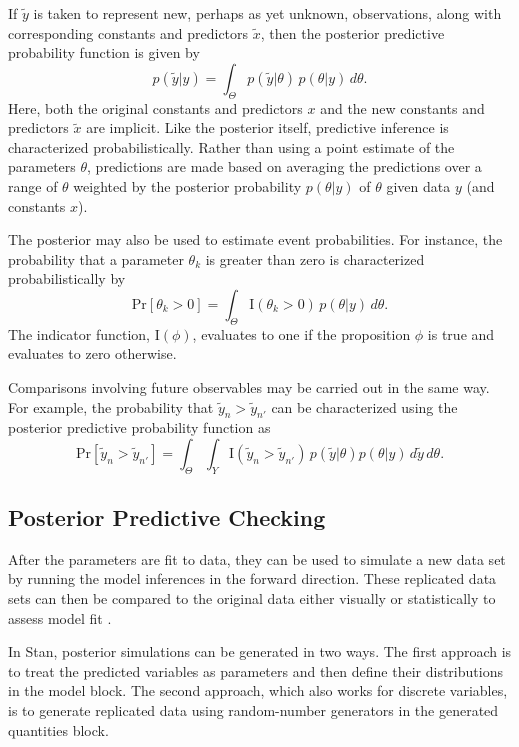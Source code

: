 If $\tilde{y}$ is taken to represent new, perhaps as yet unknown,
observations, along with corresponding constants and predictors
$\tilde{x}$, then the posterior predictive probability function is
given by
%
\[
p(\tilde{y}|y)
= \int_{\Theta} p(\tilde{y}|\theta) 
                \, p(\theta|y) \, d\theta.
\]
Here, both the original constants and predictors $x$ and the new
constants and predictors $\tilde{x}$ are implicit.  Like the posterior
itself, predictive inference is characterized probabilistically.
Rather than using a point estimate of the parameters $\theta$,
predictions are made based on averaging the predictions over a range
of $\theta$ weighted by the posterior probability $p(\theta|y)$ of
$\theta$ given data $y$ (and constants $x$).

The posterior may also be used to estimate event probabilities.  For
instance, the probability that a parameter $\theta_k$ is greater than
zero is characterized probabilistically by
%
\[
\mbox{Pr}[\theta_k > 0]
= \int_{\Theta} \mbox{I}(\theta_k > 0) \, p(\theta|y) \, d\theta.
\]
%
The indicator function, $\mbox{I}(\phi)$, evaluates to one if the
proposition $\phi$ is true and evaluates to zero otherwise.

Comparisons involving future observables may be carried out in
the same way.  For example, the probability that $\tilde{y}_n >
\tilde{y}_{n'}$ can be characterized using the posterior predictive
probability function as
\[
\mbox{Pr}[\tilde{y}_n > \tilde{y}_{n'}]
= \int_{\Theta} \int_{Y} \mbox{I}(\tilde{y}_n > \tilde{y}_{n'}) \,
p(\tilde{y}|\theta) p(\theta|y) \, d\tilde{y} \, d\theta.
\]


\subsection{Posterior Predictive Checking}

After the parameters are fit to data, they can be used to simulate a
new data set by running the model inferences in the forward
direction.  These replicated data sets can then be compared to the
original data either visually or statistically to assess model fit 
\citep[Chapter 6]{GelmanEtAl:2013}.  

In Stan, posterior simulations can be generated in two ways.  The
first approach is to treat the predicted variables as parameters and
then define their distributions in the model block.  The second
approach, which also works for discrete variables, is to generate
replicated data using random-number generators in the generated
quantities block.



